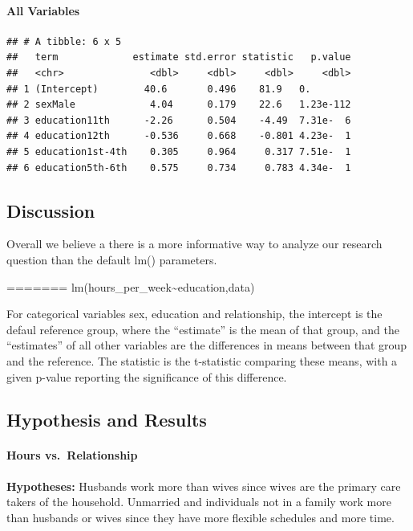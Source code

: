 \documentclass[]{article}
\let\oldparagraph\paragraph
\renewcommand{\paragraph}[1]{\oldparagraph{#1}\mbox{}}
\begin{document}
\hypertarget{all-variables}{%
\paragraph{All Variables}\label{all-variables}}

\begin{verbatim}
## # A tibble: 6 x 5
##   term             estimate std.error statistic   p.value
##   <chr>               <dbl>     <dbl>     <dbl>     <dbl>
## 1 (Intercept)        40.6       0.496    81.9   0.       
## 2 sexMale             4.04      0.179    22.6   1.23e-112
## 3 education11th      -2.26      0.504    -4.49  7.31e-  6
## 4 education12th      -0.536     0.668    -0.801 4.23e-  1
## 5 education1st-4th    0.305     0.964     0.317 7.51e-  1
## 6 education5th-6th    0.575     0.734     0.783 4.34e-  1
\end{verbatim}

\hypertarget{discussion}{%
\subsection{Discussion}\label{discussion}}

Overall we believe a there is a more informative way to analyze our
research question than the default lm() parameters.

=======
lm(hours\_per\_week\textasciitilde education,data)

For categorical variables sex, education and relationship, the intercept
is the defaul reference group, where the ``estimate'' is the mean of
that group, and the ``estimates'' of all other variables are the
differences in means between that group and the reference. The statistic
is the t-statistic comparing these means, with a given p-value reporting
the significance of this difference.

\hypertarget{hypothesis-and-results}{%
\subsection{Hypothesis and Results}\label{hypothesis-and-results}}

\hypertarget{hours-vs.-relationship}{%
\paragraph{Hours vs.~Relationship}\label{hours-vs.-relationship}}

\textbf{Hypotheses:} Husbands work more than wives since wives are the
primary care takers of the household. Unmarried and individuals not in a
family work more than husbands or wives since they have more flexible
schedules and more time.
\end{document}
